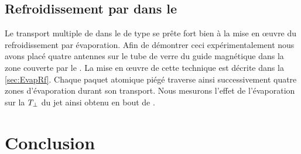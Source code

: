 %

\subsection{Refroidissement par \evap dans le \tp}
Le transport multiple de \pats dans le \tp de type \IP se prête fort bien à la mise en \oe uvre du refroidissement par évaporation. Afin de démontrer ceci expérimentalement nous avons placé quatre antennes \rfs sur le tube de verre du guide magnétique dans la zone couverte par le \conv. La mise en \oe uvre de cette technique est décrite dans la \autoref{sec:EvapRf}. Chaque paquet atomique piégé traverse ainsi successivement quatre zones d'évaporation durant son transport. Nous mesurons l'effet de l'évaporation sur la \tempt $T_{\bot}$ du jet ainsi obtenu en bout de \gm.


\section{Conclusion}

